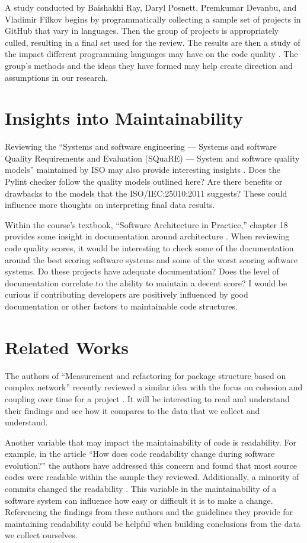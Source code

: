 \documentclass[12pt,conference]{IEEEtran}
\begin{document}
A study conducted by Baishakhi Ray, Daryl Posnett, Premkumar Devanbu, and Vladimir Filkov begins by programmatically collecting a sample set of projects in GitHub that vary in languages. Then the group of projects is appropriately culled, resulting in a final set used for the review. The results are then a study of the impact different programming languages may have on the code quality \cite{baishakhi:2017}. The group's methods and the ideas they have formed may help create direction and assumptions in our research.

\section{Insights into Maintainability}

Reviewing the ``Systems and software engineering — Systems and software Quality Requirements and Evaluation (SQuaRE) — System and software quality models'' maintained by ISO may also provide interesting insights \cite{iso/iec:25010:2011}. Does the Pylint checker follow the quality models outlined here? Are there benefits or drawbacks to the models that the ISO/IEC:25010:2011 suggests? These could influence more thoughts on interpreting final data results.

Within the course's textbook, ``Software Architecture in Practice,'' chapter 18 provides some insight in documentation around architecture \cite{book:software-architecture-in-practice}. When reviewing code quality scores, it would be interesting to check some of the documentation around the best scoring software systems and some of the worst scoring software systems. Do these projects have adequate documentation? Does the level of documentation correlate to the ability to maintain a decent score? I would be curious if contributing developers are positively influenced by good documentation or other factors to maintainable code structures.

\section{Related Works}

The authors of ``Measurement and refactoring for package structure based on complex network'' recently reviewed a similar idea with the focus on cohesion and coupling over time for a project \cite{zhou:2020}. It will be interesting to read and understand their findings and see how it compares to the data that we collect and understand.

Another variable that may impact the maintainability of code is readability. For example, in the article ``How does code readability change during software evolution?'' the authors have addressed this concern and found that most source codes were readable within the sample they reviewed. Additionally, a minority of commits changed the readability \cite{piantadosi:2020}. This variable in the maintainability of a software system can influence how easy or difficult it is to make a change. Referencing the findings from these authors and the guidelines they provide for maintaining readability could be helpful when building conclusions from the data we collect ourselves.
\end{document}
